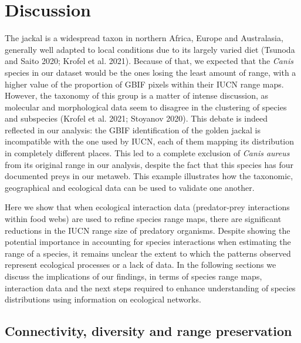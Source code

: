 \documentclass[11pt]{article}
\begin{document}
\hypertarget{discussion}{%
\section{Discussion}\label{discussion}}

The jackal is a widespread taxon in northern Africa, Europe and
Australasia, generally well adapted to local conditions due to its
largely varied diet (Tsunoda and Saito 2020; Krofel et al. 2021).
Because of that, we expected that the \emph{Canis} species in our
dataset would be the ones losing the least amount of range, with a
higher value of the proportion of GBIF pixels within their IUCN range
maps. However, the taxonomy of this group is a matter of intense
discussion, as molecular and morphological data seem to disagree in the
clustering of species and subspecies (Krofel et al. 2021; Stoyanov
2020). This debate is indeed reflected in our analysis: the GBIF
identification of the golden jackal is incompatible with the one used by
IUCN, each of them mapping its distribution in completely different
places. This led to a complete exclusion of \emph{Canis aureus} from its
original range in our analysis, despite the fact that this species has
four documented preys in our metaweb. This example illustrates how the
taxonomic, geographical and ecological data can be used to validate one
another.

Here we show that when ecological interaction data (predator-prey
interactions within food webs) are used to refine species range maps,
there are significant reductions in the IUCN range size of predatory
organisms. Despite showing the potential importance in accounting for
species interactions when estimating the range of a species, it remains
unclear the extent to which the patterns observed represent ecological
processes or a lack of data. In the following sections we discuss the
implications of our findings, in terms of species range maps,
interaction data and the next steps required to enhance understanding of
species distributions using information on ecological networks.

\hypertarget{connectivity-diversity-and-range-preservation}{%
\subsection{Connectivity, diversity and range
preservation}\label{connectivity-diversity-and-range-preservation}}
\end{document}
